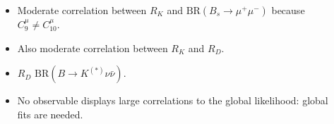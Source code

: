 \documentclass[mathserif, 10pt, dvipsnames]{beamer}
\begin{document}
\begin{frame}
\begin{columns}[onlytextwidth]
\begin{column}{0.6\textwidth}
        \end{column}
        \begin{column}{0.4\textwidth}
            \begin{itemize}
                \item Moderate correlation between $R_K$ and $\mathrm{BR}(B_s \to \mu^+ \mu^-)$ because $C_9^\mu \neq C_{10}^\mu$.
                \item Also moderate correlation between $R_K$ and $R_D$.
\item {\color{OliveGreen}{Perfect correlation between} $R_D$
            $\mathrm{BR}(B\to K^{(*)}\nu\bar{\nu})$}.
                \item No observable displays large correlations to the global likelihood: global fits are needed.
            \end{itemize}
        \end{column}
\end{columns}

\end{frame}
\end{document}

